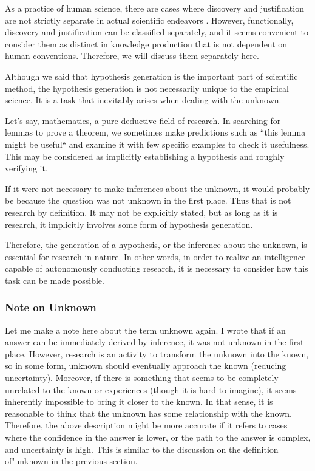 \documentclass{book}
\begin{document}
As a practice of human science, there are cases where discovery and justification are not strictly separate in actual scientific endeavors \cite{arabatzis2006inextricability}. However, functionally, discovery and justification can be classified separately, and it seems convenient to consider them as distinct in knowledge production that is not dependent on human conventions. Therefore, we will discuss them separately here.

Although we said that hypothesis generation is the important part of scientific method, the hypothesis generation is not necessarily unique to the empirical science. It is a task that inevitably arises when dealing with the unknown. 

Let's say, mathematics, a pure deductive field of research. In searching for lemmas to prove a theorem, we sometimes make predictions such as ``this lemma might be useful`` and examine it with few specific examples to check it usefulness. This may be considered as implicitly establishing a hypothesis and roughly verifying it. 

If it were not necessary to make inferences about the unknown, it would probably be because the question was not unknown in the first place. Thus that is not research by definition. It may not be explicitly stated, but as long as it is research, it implicitly involves some form of hypothesis generation. 

Therefore, the generation of a hypothesis, or the inference about the unknown, is essential for research in nature. In other words, in order to realize an intelligence capable of autonomously conducting research, it is necessary to consider how this task can be made possible.

\subsubsection{Note on Unknown}
Let me make a note here about the term unknown again. I wrote that if an answer can be immediately derived by inference, it was not unknown in the first place. However, research is an activity to transform the unknown into the known, so in some form, unknown should eventually approach the known (reducing uncertainty). Moreover, if there is something that seems to be completely unrelated to the known or experiences (though it is hard to imagine), it seems inherently impossible to bring it closer to the known. In that sense, it is reasonable to think that the unknown has some relationship with the known. Therefore, the above description might be more accurate if it refers to cases where the confidence in the answer is lower, or the path to the answer is complex, and uncertainty is high. This is similar to the discussion on the definition of"unknown in the previous section.
\end{document}
